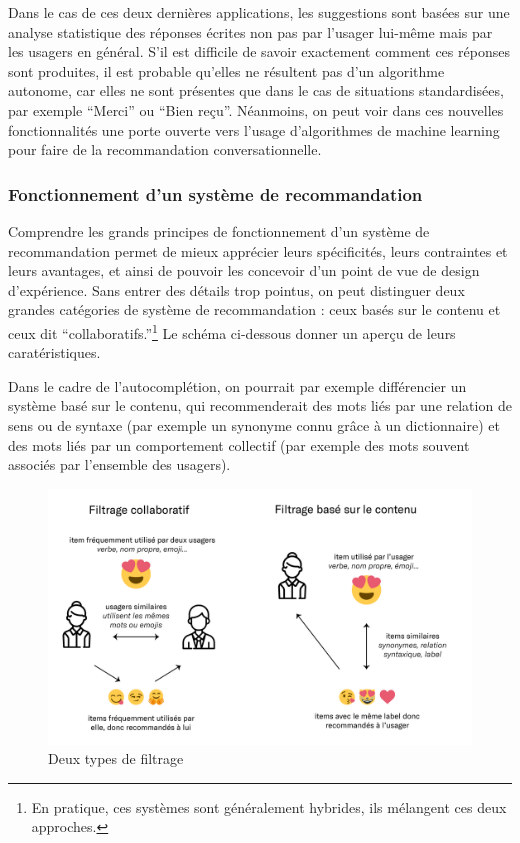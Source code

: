 \documentclass[]{article}
\begin{document}
Dans le cas de ces deux dernières applications, les suggestions sont
basées sur une analyse statistique des réponses écrites non pas par
l'usager lui-même mais par les usagers en général. S'il est difficile de
savoir exactement comment ces réponses sont produites, il est probable
qu'elles ne résultent pas d'un algorithme autonome, car elles ne sont
présentes que dans le cas de situations standardisées, par exemple
``Merci'' ou ``Bien reçu''. Néanmoins, on peut voir dans ces nouvelles
fonctionnalités une porte ouverte vers l'usage d'algorithmes de machine
learning pour faire de la recommandation conversationnelle.

\hypertarget{fonctionnement-dun-systuxe8me-de-recommandation}{%
\subsubsection{Fonctionnement d'un système de
recommandation}\label{fonctionnement-dun-systuxe8me-de-recommandation}}

Comprendre les grands principes de fonctionnement d'un système de
recommandation permet de mieux apprécier leurs spécificités, leurs
contraintes et leurs avantages, et ainsi de pouvoir les concevoir d'un
point de vue de design d'expérience. Sans entrer des détails trop
pointus, on peut distinguer deux grandes catégories de système de
recommandation : ceux basés sur le contenu et ceux dit
``collaboratifs.''\footnote{En pratique, ces systèmes sont généralement
  hybrides, ils mélangent ces deux approches.} Le schéma ci-dessous
donner un aperçu de leurs caratéristiques.

Dans le cadre de l'autocomplétion, on pourrait par exemple différencier
un système basé sur le contenu, qui recommenderait des mots liés par une
relation de sens ou de syntaxe (par exemple un synonyme connu grâce à un
dictionnaire) et des mots liés par un comportement collectif (par
exemple des mots souvent associés par l'ensemble des usagers).

\begin{figure}
\centering
\includegraphics{./tex2pdf.2952/734eb3977aec2f5d5847ce3bde5b018c6fe2c10c.png}
\caption{Deux types de filtrage}
\end{figure}
\end{document}
